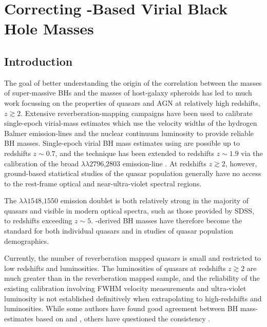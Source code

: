 
\chapter{Correcting -Based Virial Black Hole Masses}
\label{ch:bhmass}

\section{Introduction}
\label{sec:ch3-intro}

The goal of better understanding the origin of the correlation between the masses of super-massive BHs and the masses of host-galaxy spheroids has led to much work focussing on the properties of quasars and AGN at relatively high redshifts, $z\gtrsim 2$. 
Extensive reverberation-mapping campaigns have been used to calibrate single-epoch virial-mass estimates which use the velocity widths of the hydrogen Balmer emission-lines and the nuclear continuum luminosity to provide reliable BH masses.  
Single-epoch virial BH mass estimates using \hb are possible up to redshifts $z\sim0.7$, and the technique has been extended to redshifts $z\sim1.9$ via the calibration of the broad $\lambda\lambda$$2796$,$2803$ emission-line \citep{mclure02,onken08,wang09,rafiee11}. 
At redshifts $z\gtrsim2$, however, ground-based statistical studies of the quasar population generally have no access to the rest-frame optical and near-ultra-violet spectral regions.

The $\lambda\lambda$$1548$,$1550$ emission doublet is both relatively strong in the majority of quasars and visible in modern optical spectra, such as those provided by SDSS, to redshifts exceeding $z\sim5$. 
-derived BH masses have therefore become the standard \citep[e.g.][]{vestergaard06,park13} for both individual quasars and in studies of quasar population demographics.

Currently, the number of reverberation mapped quasars is small \citep[$\sim50$ quasars;][]{park13} and restricted to low redshifts and luminosities. 
The luminosities of quasars at redshifts $z\gtrsim 2$ are much greater than in the reverberation mapped sample, and the reliability of the existing calibration involving  FWHM velocity measurements and ultra-violet luminosity is not established definitively when extrapolating to high-redshifts and luminosities. 
While some authors have found good agreement between BH mass-estimates based on  and \hb \citep[e.g.][]{vestergaard06, assef11, tilton13}, others have questioned the consistency \citep[e.g.][]{baskin05,trakhtenbrot12,shen12}.

